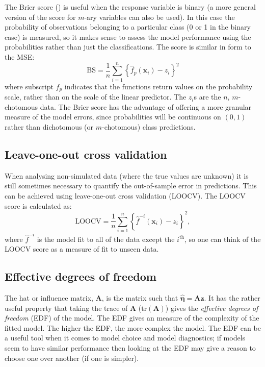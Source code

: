 The Brier score (\cite{brier50}) is useful when the response variable is binary (a more general version of the score for $m$-ary variables can also be used). In this case the probability of observations belonging to a particular class (0 or 1 in the binary case) is measured, so it makes sense to assess the model performance using the probabilities rather than just the classifications. The score is similar in form to the MSE:
\begin{equation}
\text{BS} = \frac{1}{n} \sum_{i=1}^{n} \left \{\hat{f}_p(\mathbf{x}_i)-z_i \right \}^2
\end{equation}
where subscript $f_p$ indicates that the functions return values on the probability scale, rather than on the  scale of the linear predictor. The $z_i$s are the $n$, $m$-chotomous data. The Brier score has the advantage of offering a more granular measure of the model errors, since probabilities will be continuous on $(0,1)$ rather than dichotomous (or $m$-chotomous) class predictions.

\subsection{Leave-one-out cross validation}
\label{DEFN-LOOCV}

When analysing non-simulated data (where the true values are unknown) it is still sometimes necessary to quantify the out-of-sample error in predictions. This can be achieved using leave-one-out cross validation (LOOCV). The LOOCV score is calculated as:
\begin{equation}
\text{LOOCV} = \frac{1}{n} \sum_{i=1}^n \left \{ \hat{f}^{-i}(\mathbf{x}_i) - z_i \right\}^2,
\end{equation}
where $\hat{f}^{-i}$ is the model fit to all of the data except the $i^\text{th}$, so one can think of the LOOCV score as a measure of fit to unseen data.

\subsection{Effective degrees of freedom}
\label{GAMEDF}

The hat or influence matrix, $\mathbf{A}$, is the matrix such that $\hat{\bm{\eta}} = \mathbf{A}\mathbf{z}$. It has the rather useful property that taking the trace of $\mathbf{A}$ ($\text{tr}(\mathbf{A})$) gives the \textit{effective degrees of freedom} (EDF) of the model. The EDF gives an measure of the complexity of the fitted model. The higher the EDF, the more complex the model. The EDF can be a useful tool when it comes to model choice and model diagnostics; if models seem to have similar performance then looking at the EDF may give a reason to choose one over another (if one is simpler).


